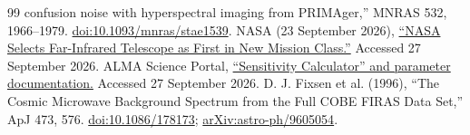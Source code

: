 \documentclass[10pt,twocolumn]{article}
\begin{document}
\begin{thebibliography}{99}
confusion noise with hyperspectral imaging from PRIMAger,'' MNRAS 532,
1966--1979.
\href{https://doi.org/10.1093/mnras/stae1539}{doi:10.1093/mnras/stae1539}.
 NASA (23 September 2026),
\href{https://www.nasa.gov/news-release/nasa-selects-far-infrared-telescope-as-first-in-new-mission-class/}{``NASA Selects Far-Infrared Telescope as First in New Mission Class.''}
Accessed 27 September 2026.
 ALMA Science Portal,
\href{https://almascience.nrao.edu/proposing/sensitivity-calculator}{``Sensitivity Calculator'' and parameter documentation.}
Accessed 27 September 2026.
 D. J. Fixsen et al. (1996), ``The Cosmic Microwave
Background Spectrum from the Full COBE FIRAS Data Set,'' ApJ 473, 576.
\href{https://doi.org/10.1086/178173}{doi:10.1086/178173};
\href{https://arxiv.org/abs/astro-ph/9605054}{arXiv:astro-ph/9605054}.
\end{thebibliography}
\end{document}
